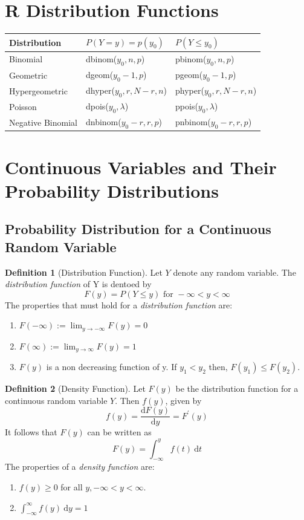 \documentclass{article}
\theoremstyle{plain}
\theoremstyle{definition}
\newtheorem{defn}{Definition}[section]
\theoremstyle{remark}
\begin{document}
\section{R Distribution Functions}
\begin{tabular}{l | l l}
Distribution & $P(Y=y) = p(y_0)$ & $P(Y \leq y_0)$\\
\hline
Binomial & dbinom($y_0,n,p$) & pbinom($y_0,n,p$)\\
Geometric & dgeom($y_0-1,p$) & pgeom($y_0-1,p$)\\
Hypergeometric & dhyper($y_0,r,N-r,n$) & phyper($y_0,r,N-r,n$)\\
Poisson & dpois($y_0,\lambda$) & ppois($y_0,\lambda$)\\  
Negative Binomial & dnbinom($y_0-r,r,p$) & pnbinom($y_0-r,r,p$)
\end{tabular}

\section{Continuous Variables and Their Probability Distributions}

\subsection{Probability Distribution for a Continuous Random Variable}

\begin{defn}[Distribution Function] 
  Let $Y$ denote any random variable. The \textit{distribution function} of Y is dentoed by 
  $$
  F(y) = P(Y \leq y) \text{ for } - \infty < y < \infty
  $$
  The properties that must hold for a \textit{distribution function} are:
  \begin{enumerate}
    \item $F(- \infty) := \displaystyle \lim_{y \to - \infty} F(y) = 0$
    \item $F(\infty) := \displaystyle \lim_{y \to \infty} F(y) = 1$
    \item $F(y)$ is a non decreasing function of y. If $y_1 < y_2$ then, $F(y_1) \leq F(y_2)$.
  \end{enumerate}
\end{defn}

\begin{defn}[Density Function] 
  Let $F(y)$ be the distribution function for a continuous random variable $Y$. Then $f(y)$, given by
$$
f(y) = \frac{\mathrm{d}F(y)}{\mathrm{d}y} = F^\prime (y)
$$
It follows that $F(y)$ can be written as
$$
F(y) = \displaystyle \int_{- \infty}^{y} f(t)\ \mathrm{d}t
$$
The properties of a \textit{density function} are:
\begin{enumerate}
  \item $f(y) \geq 0$ for all $y, - \infty < y < \infty$.
  \item $\int_{- \infty}^{\infty} f(y)\ \mathrm{d}y = 1$
\end{enumerate}
\end{defn}
\end{document}
